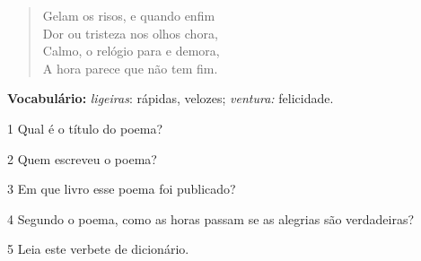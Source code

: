 \begin{myquote}
\begin{verse}
Gelam os risos, e quando enfim\\
Dor ou tristeza nos olhos chora,\\
Calmo, o relógio para e demora,\\
A hora parece que não tem fim.
\end{verse}


\begin{small}
\textbf{Vocabulário:} \textit{ligeiras}: rápidas, velozes; \textit{ventura:} felicidade.
\end{small}
\end{myquote}

\num{1} Qual é o título do poema?


\num{2} Quem escreveu o poema?


\num{3} Em que livro esse poema foi publicado?


\num{4} Segundo o poema, como as horas passam se as alegrias são verdadeiras?


\num{5} Leia este verbete de dicionário.

